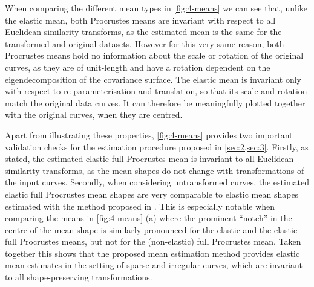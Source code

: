 When comparing the different mean types in \cref{fig:4-means} we can see that, unlike the elastic mean, both Procrustes means are invariant with respect to all Euclidean similarity transforms, as the estimated mean is the same for the transformed and original datasets.
However for this very same reason, both Procrustes means hold no information about the scale or rotation of the original curves, as they are of unit-length and have a rotation dependent on the eigendecomposition of the covariance surface.
The elastic mean is invariant only with respect to re-parameterisation and translation, so that its scale and rotation match the original data curves.
It can therefore be meaningfully plotted together with the original curves, when they are centred.

Apart from illustrating these properties, \cref{fig:4-means} provides two important validation checks for the estimation procedure proposed in \cref{sec:2,sec:3}.
Firstly, as stated, the estimated elastic full Procrustes mean is invariant to all Euclidean similarity transforms, as the mean shapes do not change with transformations of the input curves.
Secondly, when considering untransformed curves, the estimated elastic full Procrustes mean shapes are very comparable to elastic mean shapes estimated with the method proposed in \cite{Steyer2021}.
This is especially notable when comparing the means in \cref{fig:4-means} (a) where the prominent \enquote{notch} in the centre of the mean shape is similarly pronounced for the elastic and the elastic full Procrustes means, but not for the (non-elastic) full Procrustes mean.
Taken together this shows that the proposed mean estimation method provides elastic mean estimates in the setting of sparse and irregular curves, which are invariant to all shape-preserving transformations.


